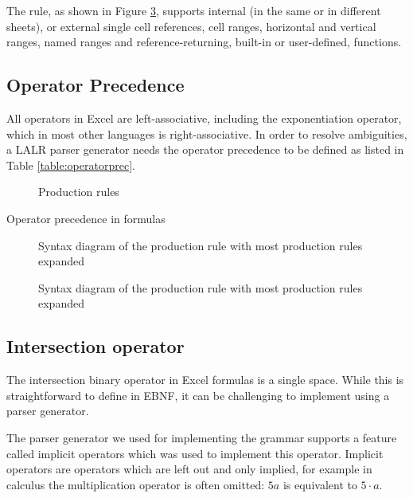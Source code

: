 \documentclass[conference]{IEEEtran}
\begin{document}
The  rule, as shown in Figure \ref{figure:Reference}, supports internal (in the same or in different sheets), or external single cell references, cell ranges, horizontal and vertical ranges, named ranges and reference-returning, built-in or user-defined, functions.

\subsection{Operator Precedence}
\label{sec:operatorprecedence}

All operators in Excel are left-associative, including the exponentiation operator, which in most other languages is right-associative.
In order to resolve ambiguities, a LALR parser generator needs the operator precedence to be defined as listed in Table \ref{table:operatorprec}.

\begin{figure}[p]
\centering

\caption{Production rules}
\label{figure:productions}
\end{figure}

\begin{table}[p]
	\centering
	\caption{Operator precedence in formulas}
	\label{table:operatorprec}
	
\end{table}

\begin{figure}[p]
	
	\caption{Syntax diagram of the  production rule with most production rules expanded}
	\label{figure:Formula}
\end{figure}

\begin{figure}[p]
	\centering
	
	\caption{Syntax diagram of the  production rule with most production rules expanded}
	\label{figure:Reference}
\end{figure}

\subsection{Intersection operator}

The intersection binary operator in Excel formulas is a single space.
While this is straightforward to define in EBNF, it can be challenging to implement using a parser generator.

The parser generator we used for implementing the grammar supports a feature called implicit operators which was used to implement this operator.
Implicit operators are operators which are left out and only implied, for example in calculus the multiplication operator is often omitted: $5a$ is equivalent to $5 \cdot a$.
\end{document}
